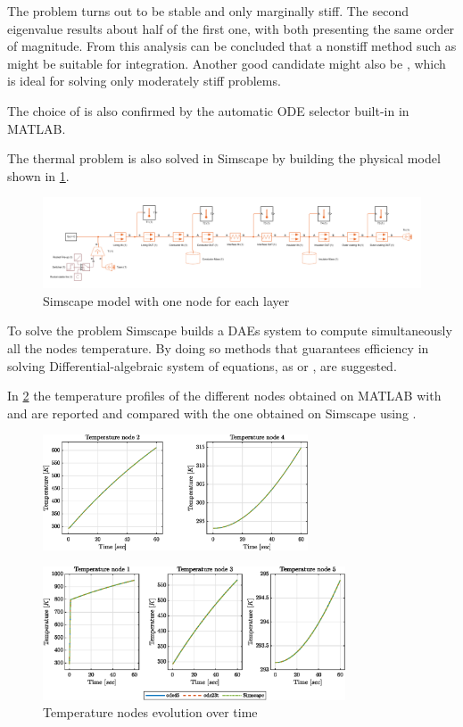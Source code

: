 \documentclass[11pt,a4paper,oneside]{article}
\begin{document}
The problem turns out to be stable and only marginally stiff.
The second eigenvalue results about half of the first one, with both presenting the same order of magnitude.
From this analysis can be concluded that a nonstiff method such as  might be suitable for integration.
Another good candidate might also be , which is ideal for solving only moderately stiff problems.

The choice of  is also confirmed by the automatic ODE selector built-in in MATLAB.

The thermal problem is also solved in Simscape by building the physical model shown in \cref{fig:ex1_simscapeCase1}.
\begin{figure}[htb]
    \centering
    \includegraphics*[width=1\textwidth, keepaspectratio]{Figures/ex1_simscapeCase1.pdf}
    \caption[]{\label{fig:ex1_simscapeCase1} Simscape model with one node for each layer}
\end{figure}

To solve the problem Simscape builds a DAEs system to compute simultaneously all the nodes temperature.
By doing so methods that guarantees efficiency in solving Differential-algebraic system of equations, as  or , are suggested. 

In \cref{fig:ex1_tempNodes} the temperature profiles of the different nodes obtained on MATLAB with  and  are reported and compared with the one obtained on Simscape using .
\begin{figure}[H]
    \centering
    \includegraphics*[width=0.7\textwidth, keepaspectratio]{Figures/ex1_tempKeyNodes.eps}
\end{figure}
\begin{figure}[H]
    \centering
    \includegraphics*[width=0.8\textwidth, keepaspectratio]{Figures/ex1_tempOtherNodes.eps}
    \caption[]{\label{fig:ex1_tempNodes} Temperature nodes evolution over time}
\end{figure}
\end{document}
